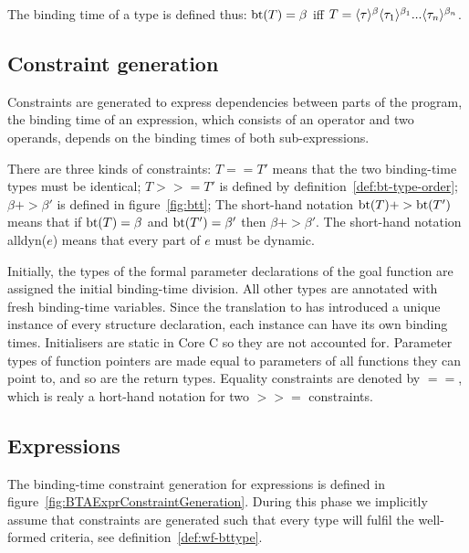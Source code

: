 \begin{docpart}
\begin{Def}
  \label{def:bt-of-type}
  The binding time of a type is defined thus: $\mbox{bt}(T)=\beta$ iff $T =
  \langle{\tau}\rangle^{\beta} \langle{\tau_1}\rangle^{\beta_1} ...
  \langle{\tau_n}\rangle^{\beta_n}$.
\end{Def}

\subsection{Constraint generation}
Constraints are generated to express dependencies between parts of the
program, \eg the binding time of an expression, which consists of an
operator and two operands, depends on the binding times of both
sub-expressions. 

There are three kinds of constraints: $T == T'$ means that the two
binding-time types must be identical; $T >>= T'$ is defined by
definition~\ref{def:bt-type-order}; $\beta +> \beta'$ is defined in
figure~\ref{fig:btt}; The short-hand notation $\mbox{bt}(T) +> \mbox{bt}(T')$
means that if $\mbox{bt}(T)=\beta$ and $\mbox{bt}(T')=\beta'$ then $\beta +>
\beta'$. The short-hand notation alldyn($e$) means that every part of
$e$ must be dynamic.

Initially, the types of the formal parameter declarations of the goal
function are assigned the initial binding-time division. All other
types are annotated with fresh binding-time variables. Since the
translation to \coreC has introduced a unique instance of every
structure declaration, each instance can have its own binding times.
Initialisers are static in Core C so they are not accounted for.
Parameter types of function pointers are made equal to parameters of
all functions they can point to, and so are the return types. Equality
constraints are denoted by $==$, which is realy a hort-hand notation
for two $>>=$ constraints.

\subsection{Expressions}
\label{sec:BTAExpressions}
The binding-time constraint generation for expressions is defined in
figure~\ref{fig:BTAExprConstraintGeneration}. During this phase we
implicitly assume that constraints are generated such that every type will
fulfil the well-formed criteria, see definition~\ref{def:wf-bttype}.

\bigskip

\begin{figure*}%
\begin{frameit}
\noindent{}\hfill{}


\end{frameit}
\end{figure*}
\end{docpart}

